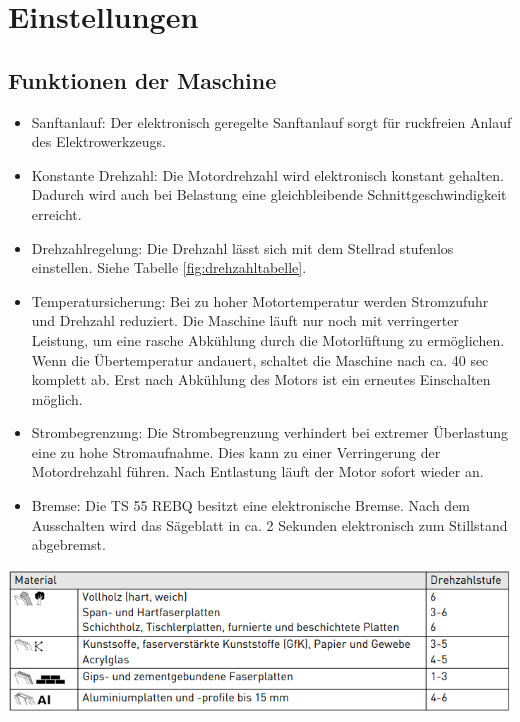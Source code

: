 \documentclass{\basedir/fablab-document}
\begin{document}
\section{Einstellungen}
\subsection{Funktionen der Maschine}
\begin{itemize}
\item Sanftanlauf: Der elektronisch geregelte Sanftanlauf sorgt für ruckfreien Anlauf des Elektrowerkzeugs.
\item Konstante Drehzahl: Die Motordrehzahl wird elektronisch konstant gehalten. Dadurch wird auch bei Belastung eine gleichbleibende Schnittgeschwindigkeit erreicht.
\item Drehzahlregelung: Die Drehzahl lässt sich mit dem Stellrad stufenlos einstellen. Siehe Tabelle \ref{fig:drehzahltabelle}.
\item Temperatursicherung: Bei zu hoher Motortemperatur werden Stromzufuhr und Drehzahl reduziert. Die Maschine läuft nur noch mit verringerter Leistung, um eine rasche Abkühlung durch die Motorlüftung zu ermöglichen. Wenn die Übertemperatur andauert, schaltet die Maschine nach ca. 40 sec komplett ab. Erst nach Abkühlung des Motors ist ein erneutes Einschalten möglich.
\item Strombegrenzung: Die Strombegrenzung verhindert bei extremer Überlastung eine zu hohe Stromaufnahme. Dies kann zu einer Verringerung der Motordrehzahl führen. Nach Entlastung läuft der Motor sofort wieder an.
\item Bremse: Die TS 55 REBQ besitzt eine elektronische Bremse. Nach dem Ausschalten wird das Sägeblatt in ca. 2 Sekunden elektronisch zum Stillstand abgebremst.
\end{itemize}

\centering
	\includegraphics[width=1\textwidth]{img/Drehzahltabelle.png}
	\label{fig:drehzahltabelle}
\end{document}
